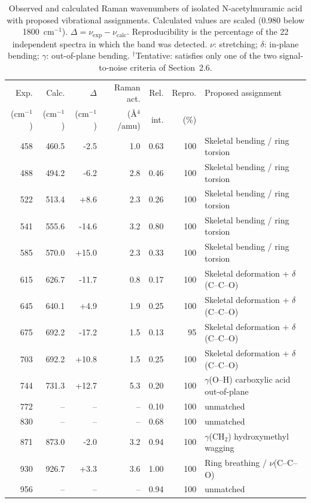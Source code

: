 \documentclass[11pt,a4paper]{article}
\newcommand{\wn}{\ensuremath{\mathrm{cm}^{-1}}}
\begin{document}
\begin{table}[htbp]
\centering
\caption{Observed and calculated Raman wavenumbers of isolated N-acetylmuramic
acid with proposed vibrational assignments. Calculated values are scaled (0.980
below 1800~\wn{}). $\Delta = \nu_{\mathrm{exp}} - \nu_{\mathrm{calc}}$.
Reproducibility is the percentage of the 22 independent spectra in which the
band was detected. $\nu$: stretching; $\delta$: in-plane bending; $\gamma$:
out-of-plane bending. $^{\dagger}$Tentative: satisfies only one of the two
signal-to-noise criteria of Section~2.6.}
\label{tab:comparison}
\small
\begin{tabular}{rrrrrrp{4.4cm}}
\toprule
Exp. & Calc. & $\Delta$ & Raman act. & Rel. & Repro. & Proposed assignment \\
(\wn{}) & (\wn{}) & (\wn{}) & (\AA$^4$/amu) & int. & (\%) & \\
\midrule
458 & 460.5 & -2.5 & 1.0 & 0.63 & 100 & Skeletal bending / ring torsion \\
488 & 494.2 & -6.2 & 2.8 & 0.46 & 100 & Skeletal bending / ring torsion \\
522 & 513.4 & +8.6 & 2.3 & 0.26 & 100 & Skeletal bending / ring torsion \\
541 & 555.6 & -14.6 & 3.2 & 0.80 & 100 & Skeletal bending / ring torsion \\
585 & 570.0 & +15.0 & 2.3 & 0.33 & 100 & Skeletal bending / ring torsion \\
615 & 626.7 & -11.7 & 0.8 & 0.17 & 100 & Skeletal deformation + $\delta$(C--C--O) \\
645 & 640.1 & +4.9 & 1.9 & 0.25 & 100 & Skeletal deformation + $\delta$(C--C--O) \\
675 & 692.2 & -17.2 & 1.5 & 0.13 & 95 & Skeletal deformation + $\delta$(C--C--O) \\
703 & 692.2 & +10.8 & 1.5 & 0.25 & 100 & Skeletal deformation + $\delta$(C--C--O) \\
744 & 731.3 & +12.7 & 5.3 & 0.20 & 100 & $\gamma$(O--H) carboxylic acid out-of-plane \\
772 & -- & -- & -- & 0.10 & 100 & unmatched \\
830 & -- & -- & -- & 0.68 & 100 & unmatched \\
871 & 873.0 & -2.0 & 3.2 & 0.94 & 100 & $\gamma$(CH$_2$) hydroxymethyl wagging \\
930 & 926.7 & +3.3 & 3.6 & 1.00 & 100 & Ring breathing / $\nu$(C--C--O) \\
956 & -- & -- & -- & 0.94 & 100 & unmatched \\

\end{tabular}
\end{table}
\end{document}
